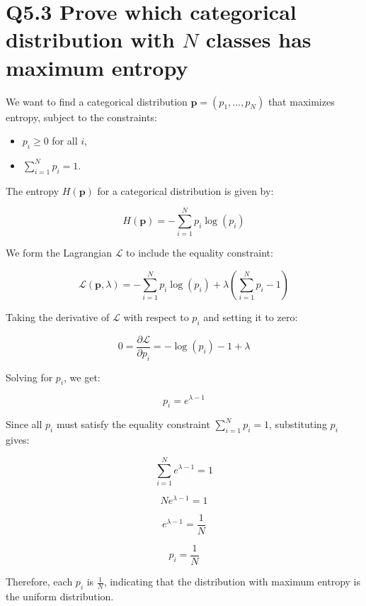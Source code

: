 \documentclass[11pt]{article}
\begin{document}
\section{Q5.3 Prove which categorical distribution with $N$ classes has maximum entropy}

We want to find a categorical distribution \( \mathbf{p} = (p_1, \ldots, p_N) \) that maximizes entropy, subject to the constraints:

\begin{itemize}
    \item \( p_i \geq 0 \) for all \( i \),
    \item \( \sum_{i=1}^{N} p_i = 1 \).
\end{itemize}

The entropy \( H(\mathbf{p}) \) for a categorical distribution is given by:

\[ H(\mathbf{p}) = -\sum_{i=1}^{N} p_i \log(p_i) \]

We form the Lagrangian \( \mathcal{L} \) to include the equality constraint:

\[ \mathcal{L}(\mathbf{p}, \lambda) = -\sum_{i=1}^{N} p_i \log(p_i) + \lambda \left( \sum_{i=1}^{N} p_i - 1 \right) \]

Taking the derivative of \( \mathcal{L} \) with respect to \( p_i \) and setting it to zero:

\[ 0 = \frac{\partial \mathcal{L}}{\partial p_i} = -\log(p_i) - 1 + \lambda \]

Solving for \( p_i \), we get:

\[ p_i = e^{\lambda - 1} \]

Since all \( p_i \) must satisfy the equality constraint \( \sum_{i=1}^{N} p_i = 1 \), substituting \( p_i \) gives:

\[ \sum_{i=1}^{N} e^{\lambda - 1} = 1 \]

\[ N e^{\lambda - 1} = 1 \]

\[ e^{\lambda - 1} = \frac{1}{N} \]

\[ p_i = \frac{1}{N} \]

Therefore, each \( p_i \) is \( \frac{1}{N} \), indicating that the distribution with maximum entropy is the uniform distribution.
\end{document}
